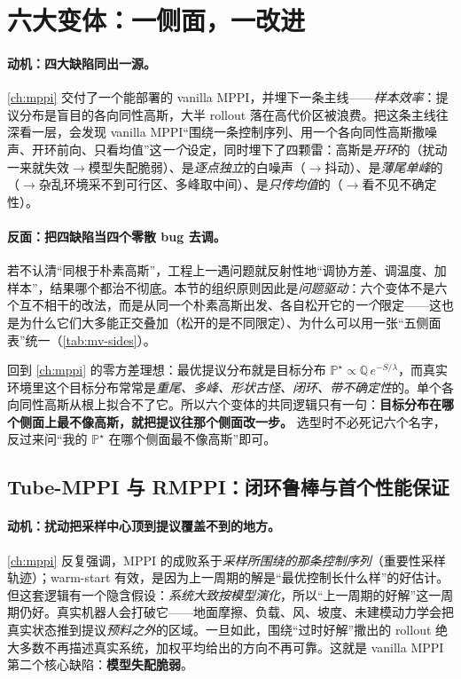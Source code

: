 \section{六大变体：一侧面，一改进}
\label{sec:mv-six}

\paragraph{动机：四大缺陷同出一源。}
\cref{ch:mppi} 交付了一个能部署的 vanilla MPPI，并埋下一条主线——\emph{样本效率}：提议分布是盲目的各向同性高斯，大半 rollout 落在高代价区被浪费。把这条主线往深看一层，会发现 vanilla MPPI“围绕一条控制序列、用一个各向同性高斯撒噪声、开环前向、只看均值”这\emph{一个}设定，同时埋下了四颗雷：高斯是\emph{开环}的（扰动一来就失效$\to$模型失配脆弱）、是\emph{逐点独立}的白噪声（$\to$抖动）、是\emph{薄尾单峰}的（$\to$杂乱环境采不到可行区、多峰取中间）、是\emph{只传均值}的（$\to$看不见不确定性）。

\paragraph{反面：把四缺陷当四个零散 bug 去调。}
若不认清“同根于朴素高斯”，工程上一遇问题就反射性地“调协方差、调温度、加样本”，结果哪个都治不彻底。本节的组织原则因此是\emph{问题驱动}：六个变体不是六个互不相干的改法，而是从同一个朴素高斯出发、各自松开它的\emph{一个}限定——这也是为什么它们大多能正交叠加（松开的是不同限定）、为什么可以用一张“五侧面表”统一（\cref{tab:mv-sides}）。

\begin{insight}
回到 \cref{ch:mppi} 的零方差理想：最优提议分布就是目标分布 $\mathbb{P}^\star\propto\mathbb{Q}\,e^{-S/\lambda}$，而真实环境里这个目标分布常常是\emph{重尾、多峰、形状古怪、闭环、带不确定性}的。单个各向同性高斯从根上拟合不了它。所以六个变体的共同逻辑只有一句：\textbf{目标分布在哪个侧面上最不像高斯，就把提议往那个侧面改一步。} 选型时不必死记六个名字，反过来问“我的 $\mathbb{P}^\star$ 在哪个侧面最不像高斯”即可。
\end{insight}

\subsection{Tube-MPPI 与 RMPPI：闭环鲁棒与首个性能保证}
\label{sec:mv-robust}

\paragraph{动机：扰动把采样中心顶到提议覆盖不到的地方。}
\cref{ch:mppi} 反复强调，MPPI 的成败系于\emph{采样所围绕的那条控制序列}（重要性采样轨迹）；warm-start 有效，是因为上一周期的解是“最优控制长什么样”的好估计。但这套逻辑有一个隐含假设：\emph{系统大致按模型演化}，所以“上一周期的好解”这一周期仍好。真实机器人会打破它——地面摩擦、负载、风、坡度、未建模动力学会把真实状态推到提议\emph{预料之外}的区域\cite{gandhi2021robust}。一旦如此，围绕“过时好解”撒出的 rollout 绝大多数不再描述真实系统，加权平均给出的方向不再可靠。这就是 vanilla MPPI 第二个核心缺陷：\textbf{模型失配脆弱}。

